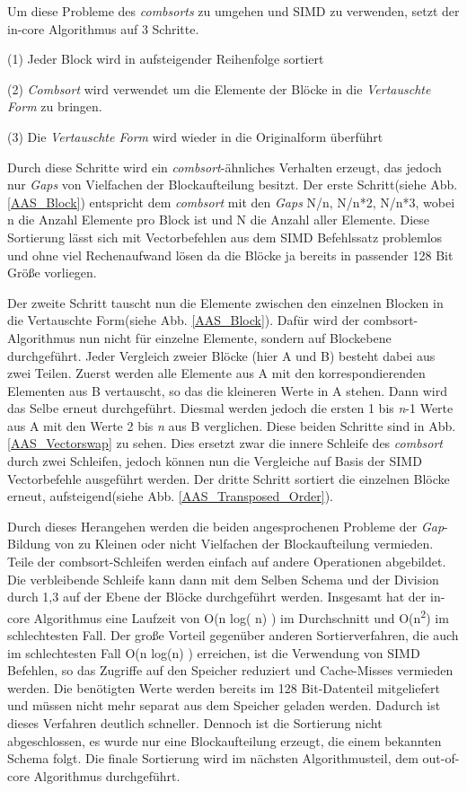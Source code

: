 Um diese Probleme des \textit{combsorts} zu umgehen und SIMD zu verwenden, setzt der in-core Algorithmus auf 3 Schritte.


(1) Jeder Block wird in aufsteigender Reihenfolge sortiert

(2) \textit{Combsort} wird verwendet um die Elemente der Blöcke in die \textit{Vertauschte Form} zu bringen.

(3) Die \textit{Vertauschte Form} wird wieder in die Originalform überführt


Durch diese Schritte wird ein \textit{combsort}-ähnliches Verhalten erzeugt, das jedoch nur \textit{Gaps} von Vielfachen der Blockaufteilung besitzt. Der erste Schritt(siehe Abb. \ref{AAS_Block}) entspricht dem \textit{combsort} mit den \textit{Gaps} N/n, N/n*2, N/n*3, wobei n die Anzahl Elemente pro Block ist und N die Anzahl aller Elemente. Diese Sortierung lässt sich mit Vectorbefehlen aus dem SIMD Befehlssatz problemlos und ohne viel Rechenaufwand lösen da die Blöcke ja bereits in passender 128 Bit Größe vorliegen.

Der zweite Schritt tauscht nun die Elemente zwischen den einzelnen Blocken in die Vertauschte Form(siehe Abb. \ref{AAS_Block}). Dafür wird der combsort-Algorithmus nun nicht für einzelne Elemente, sondern auf Blockebene durchgeführt. Jeder Vergleich zweier Blöcke (hier A und B) besteht dabei aus zwei Teilen. Zuerst werden alle Elemente aus A mit den korrespondierenden Elementen aus B vertauscht, so das die kleineren Werte in A stehen. Dann wird das Selbe erneut durchgeführt. Diesmal werden jedoch die ersten 1 bis \textit{n}-1 Werte aus A mit den Werte 2 bis \textit{n} aus B verglichen. Diese beiden Schritte sind in Abb. \ref{AAS_Vectorswap} zu sehen. Dies ersetzt zwar die innere Schleife des \textit{combsort} durch zwei Schleifen, jedoch können nun die Vergleiche auf Basis der SIMD Vectorbefehle ausgeführt werden. Der dritte Schritt sortiert die einzelnen Blöcke erneut, aufsteigend(siehe Abb. \ref{AAS_Transposed_Order}).

Durch dieses Herangehen werden die beiden angesprochenen Probleme der \textit{Gap}-Bildung von zu Kleinen oder nicht Vielfachen der Blockaufteilung vermieden. Teile der combsort-Schleifen werden einfach auf andere Operationen abgebildet. Die verbleibende Schleife kann dann mit dem Selben Schema und der Division durch 1,3 auf der Ebene der Blöcke durchgeführt werden. Insgesamt hat der in-core Algorithmus eine Laufzeit von O(n log( n) ) im Durchschnitt und O(n\textsuperscript{2}) im schlechtesten Fall. Der große Vorteil gegenüber anderen Sortierverfahren, die auch im schlechtesten Fall O(n log(n) ) erreichen, ist die Verwendung von SIMD Befehlen, so das Zugriffe auf den Speicher reduziert und Cache-Misses vermieden werden. Die benötigten Werte werden bereits im 128 Bit-Datenteil mitgeliefert und müssen nicht mehr separat aus dem Speicher geladen werden. Dadurch ist dieses Verfahren deutlich schneller. Dennoch ist die Sortierung nicht abgeschlossen, es wurde nur eine Blockaufteilung erzeugt, die einem bekannten Schema folgt. Die finale Sortierung wird im nächsten Algorithmusteil, dem  out-of-core Algorithmus durchgeführt.


